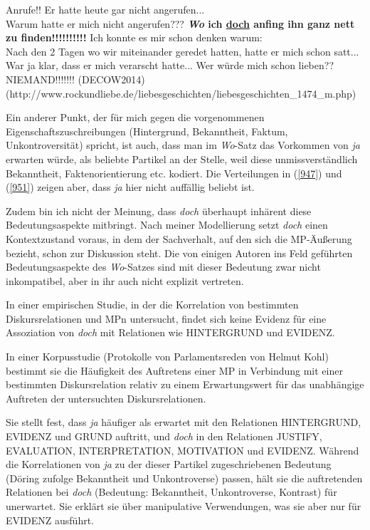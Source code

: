 {\begin{exe}
	\ex\label{961}
	\scriptsize
	Anrufe!! Er hatte heute gar nicht angerufen...\\
	Warum hatte er mich nicht angerufen??? \textbf{\textit{Wo} ich \underline{doch} anfing ihn ganz nett zu finden!!!!!!!!!!} Ich konnte es mir schon 			denken warum:\\
	Nach den 2 Tagen wo wir miteinander geredet hatten, hatte er mich schon satt...\\
	War ja klar, dass er mich verarscht hatte... Wer würde mich schon lieben??\\
	NIEMAND!!!!!!! 			
	\hfill\hbox{(DECOW2014)}
	\newline
	\hbox{}\hfill\hbox{(http://www.rockundliebe.de/liebesgeschichten/liebesgeschichten\_1474\_m.php)}
\end{exe}										  
Ein anderer Punkt, der für mich gegen die vorgenommenen Eigenschaftszuschreibungen (Hintergrund, Bekanntheit, Faktum, Unkontroversität) spricht, ist auch, dass man im \textit{Wo}-Satz das Vorkommen von \textit{ja} erwarten würde, als beliebte Partikel an der Stelle, weil diese unmissverständlich Bekanntheit, Faktenorientierung etc. kodiert. Die Verteilungen in (\ref{947}) und (\ref{951}) zeigen aber, dass \textit{ja} hier nicht auffällig beliebt ist.

Zudem bin ich nicht der Meinung, dass \textit{doch} überhaupt inhärent diese Bedeutungsaspekte mitbringt. Nach meiner Modellierung setzt \textit{doch} einen Kontextzustand voraus, in dem der Sachverhalt, auf den sich die MP-Äußerung bezieht, schon zur Diskussion steht. Die von einigen Autoren ins Feld geführten Bedeutungsaspekte des \textit{Wo}-Satzes sind mit dieser Bedeutung zwar nicht inkompatibel, aber in ihr auch nicht explizit vertreten. 

In einer empirischen Studie, in der \citet{Doering2014} die Korrelation von be\-stimmten Diskursrelationen und MPn untersucht, findet sich keine Evidenz für eine Assoziation von \textit{doch} mit Relationen wie HINTERGRUND und EVIDENZ. 

In einer Korpusstudie (Protokolle von Parlamentsreden von Helmut Kohl) be\-stimmt sie die Häufigkeit des Auftretens einer MP in Verbindung mit einer be\-stimmten Diskursrelation relativ zu einem Erwartungswert für das unabhängige Auftreten der untersuchten  Diskursrelationen. 

Sie stellt fest, dass \textit{ja} häufiger als erwartet mit den Relationen HINTERGRUND, EVIDENZ und GRUND auftritt, und \textit{doch} in den Relationen JUSTIFY, EVALUATION, INTERPRETATION, MOTIVATION und EVIDENZ. Während die Korrelationen von \textit{ja} zu der dieser Partikel zugeschriebenen Bedeutung (Döring zufolge Bekanntheit und Unkontroverse) passen, hält sie die auftretenden Relationen bei \textit{doch} (Bedeutung: Bekanntheit, Unkontroverse, Kontrast) für unerwartet. Sie erklärt sie über manipulative Verwendungen, was sie aber nur für EVIDENZ ausführt. 

}
